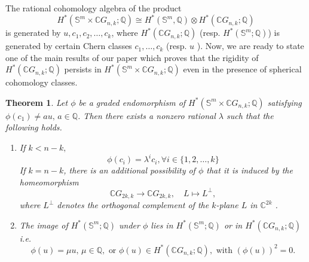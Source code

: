 \documentclass{amsart}
\newtheorem{theorem}{Theorem}[section]
\begin{document}
	The rational cohomology algebra of the product
	\[
	H^*(\mathbb S^m \times \mathbb CG_{n,k};\mathbb Q)\cong H^*(\mathbb S^m,\mathbb Q)\otimes H^*(\mathbb CG_{n,k};\mathbb Q)
	\]
	is generated by $u,c_1,c_2,\dots,c_k$, where $H^*(\mathbb{C}G_{n,k};\mathbb{Q})$ (resp. $H^*(\mathbb S^m;\mathbb Q)$) is generated by certain Chern classes $c_1, \dots, c_k$ (resp. $u$%
). Now, we %
are ready to state one of the main results of our paper which proves that the rigidity of $H^*(\mathbb CG_{n,k};\mathbb Q)$ persists in $H^*(\mathbb S^m \times \mathbb CG_{n,k};\mathbb Q)$ even in the presence of spherical cohomology classes.
	\begin{theorem}
		Let $\phi$ be a graded endomorphism of 
		$H^*(\mathbb S^{m}\times\mathbb C G_{n,k};\mathbb Q)$ 
		satisfying $\phi(c_1)\neq a u, \, a\in\mathbb Q$.  
		Then there exists a nonzero rational $\lambda$ such that the following %
holds.
		\begin{enumerate}\label{result main}
			\item If %
$k < n - k,$ 
			$$ \phi(c_i) = \lambda^i c_i, \forall i \in \{1,2,\dots,k\}$$
			If %
$k = n - k$, there is an additional possibility of $\phi$ that it is induced by the homeomorphism 
			\[
			\mathbb{C}G_{2k,k} \longrightarrow \mathbb{C}G_{2k,k}, 
			\quad L \longmapsto L^{\perp},
			\]
			where $L^{\perp}$ denotes the orthogonal complement of the $k$-plane $L$ in $\mathbb{C}^{2k}$%
.
			
			\item 
			The %
image of $H^*(\mathbb{S}^m;\mathbb{Q})$ under $\phi$ lies in 
			$H^*(\mathbb{S}^m;\mathbb{Q})$ or in %
$H^*(\mathbb{C}G_{n,k};\mathbb{Q})$ i.e. $$\phi(u) = \mu u,\, \mu \in \mathbb{Q}, \text{ or } \phi(u) \in H^*(\mathbb{C}G_{n,k};\mathbb{Q}), \text{ with } (\phi(u))^2 =0.$$
			
		\end{enumerate}
	\end{theorem}
\end{document}
